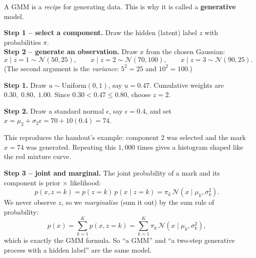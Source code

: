 \documentclass[11pt,a4paper]{article}
\newcommand{\N}{\mathcal{N}}
\begin{document}
A GMM is a \emph{recipe} for generating data. This is why it is called a \textbf{generative} model.

\begin{center}
\end{center}

\textbf{Step 1 -- select a component.} Draw the hidden (latent) label $z$ with probabilities $\pi$.\\
\textbf{Step 2 -- generate an observation.} Draw $x$ from the chosen Gaussian:
\[
x\mid z=1\sim\N(50,25),\qquad x\mid z=2\sim\N(70,100),\qquad x\mid z=3\sim\N(90,25).
\]
(The second argument is the \emph{variance}: $5^2=25$ and $10^2=100$.)

\begin{example}
\textbf{Step 1.} Draw $u\sim\mathrm{Uniform}(0,1)$, say $u=0.47$. Cumulative weights are $0.30,\;0.80,\;1.00$. Since $0.30<0.47\le0.80$, choose $z=2$.

\textbf{Step 2.} Draw a standard normal $\epsilon$, say $\epsilon=0.4$, and set $x=\mu_2+\sigma_2\epsilon=70+10(0.4)=74$.

This reproduces the handout's example: component 2 was selected and the mark $x=74$ was generated. Repeating this $1{,}000$ times gives a histogram shaped like the red mixture curve.
\end{example}

\textbf{Step 3 -- joint and marginal.} The joint probability of a mark and its component is prior $\times$ likelihood:
\[
p(x,z=k)=p(z=k)\,p(x\mid z=k)=\pi_k\,\N(x\mid\mu_k,\sigma_k^2).
\]
We never observe $z$, so we \emph{marginalise} (sum it out) by the sum rule of probability:
\[
p(x)=\sum_{k=1}^Kp(x,z=k)=\sum_{k=1}^K\pi_k\,\N(x\mid\mu_k,\sigma_k^2),
\]
which is exactly the GMM formula. So ``a GMM'' and ``a two-step generative process with a hidden label'' are the same model.
\end{document}
